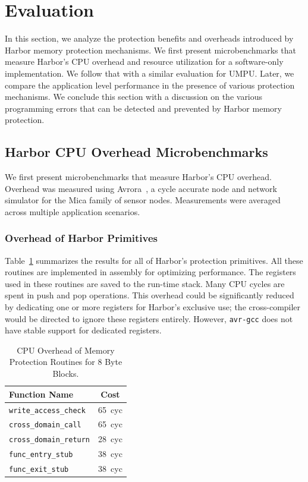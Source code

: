 \section{Evaluation}
\label{sec:eval} 
%
In this section, we analyze the protection benefits and overheads
introduced by Harbor memory protection mechanisms.
%
We first present microbenchmarks that measure Harbor's CPU overhead
and resource utilization for a software-only implementation.
%
We follow that with a similar evaluation for UMPU.
%
Later, we compare the application level performance in the presence of
various protection mechanisms.
%
We conclude this section with a discussion on the various programming
errors that can be detected and prevented by Harbor memory protection.
%
\subsection{Harbor CPU Overhead Microbenchmarks}
%
We first present microbenchmarks that measure Harbor's CPU overhead.
%
Overhead was measured using Avrora~\cite{titzer05avrora}, a cycle
accurate node and network simulator for the Mica family of sensor
nodes.
%
Measurements were averaged across multiple application scenarios.
%
\subsubsection{Overhead of Harbor Primitives}
%
Table~\ref{tab:harbor_routines} summarizes the results for all of Harbor's
protection primitives.
%
All these routines are implemented in assembly for optimizing performance.
%
The registers used in these routines are saved to the run-time stack.
%
Many CPU cycles are spent in push and pop operations.
%
This overhead could be significantly reduced by dedicating one or more
registers for Harbor's exclusive use; the cross-compiler would be directed
to ignore these registers entirely.
%
%
However, \texttt{avr-gcc} does not have stable support for dedicated registers.
%

\begin{table}[htdp]
\centering
\small{
\begin{tabular}{|l|c|}
	\hline
	Function Name & Cost\\
	\hline
	\texttt{write\_access\_check} & 65~cyc\\
	\texttt{cross\_domain\_call} & 65~cyc\\
	\texttt{cross\_domain\_return} & 28~cyc\\
	\texttt{func\_entry\_stub} & 38~cyc\\
	\texttt{func\_exit\_stub} & 38~cyc\\
	\hline
\end{tabular}}
\caption{CPU Overhead of Memory Protection Routines for 8 Byte Blocks.}
\label{tab:harbor_routines}
\end{table}

